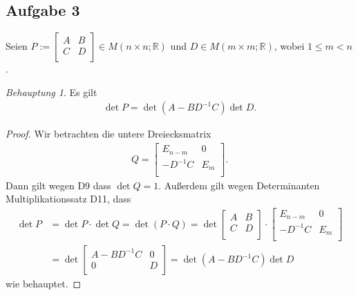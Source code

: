 \documentclass[fleqn,draft,a5paper]{article}
\theoremstyle{remark}
\newtheorem*{Behauptung}{Behauptung}
\begin{document}
\subsection{Aufgabe 3}
  Seien $P :=
  \begin{bmatrix}
     A & B \\ C & D \\
  \end{bmatrix} \in M(n \times n; \mathbb{R})
  $ und $ D \in M(m \times m; \mathbb{R})$, wobei $1 \le m < n$.
  \begin{Behauptung}
    Es gilt
    \begin{align*}
      \det P = \det (A - BD^{-1}C) \det D.
    \end{align*}
  \end{Behauptung}
  \begin{proof}
    Wir betrachten die untere Dreiecksmatrix
    \begin{align*}
      Q =
      \begin{bmatrix}
         E_{n-m} & 0 \\
         - D^{-1}C & E_{m} \\
      \end{bmatrix} .
    \end{align*}
    Dann gilt wegen D9 dass $\det Q = 1$.  Außerdem gilt wegen
    Determinanten Multiplikationssatz D11, dass
    \begin{align*}
       \det P & = \det P \cdot \det Q = \det (P \cdot Q) = \det
      \begin{bmatrix}
         A & B \\  C & D \\
      \end{bmatrix} \cdot
      \begin{bmatrix}
         E_{n-m} & 0 \\
         - D^{-1}C & E_{m} \\
      \end{bmatrix} \\
       &= \det
      \begin{bmatrix}
         A - BD^{-1}C & 0 \\  0 & D \\
      \end{bmatrix} = \det (A - BD^{-1}C) \det D
    \end{align*}
    wie behauptet.
  \end{proof}
\end{document}
